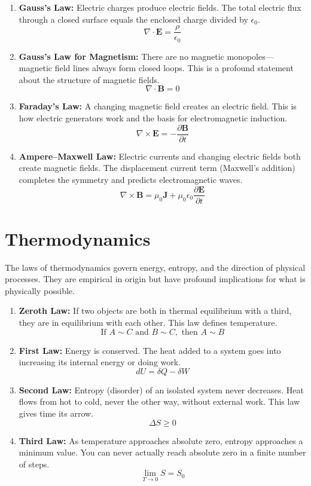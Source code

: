 \begin{enumerate}

\item \textbf{Gauss's Law:} Electric charges produce electric fields. The total electric flux through a closed surface equals the enclosed charge divided by $\epsilon_0$.
\[
\nabla \cdot \mathbf{E} = \frac{\rho}{\epsilon_0}
\]

\item \textbf{Gauss's Law for Magnetism:} There are no magnetic monopoles---magnetic field lines always form closed loops. This is a profound statement about the structure of magnetic fields.
\[
\nabla \cdot \mathbf{B} = 0
\]

\item \textbf{Faraday's Law:} A changing magnetic field creates an electric field. This is how electric generators work and the basis for electromagnetic induction.
\[
\nabla \times \mathbf{E} = -\frac{\partial \mathbf{B}}{\partial t}
\]

\item \textbf{Ampere--Maxwell Law:} Electric currents and changing electric fields both create magnetic fields. The displacement current term (Maxwell's addition) completes the symmetry and predicts electromagnetic waves.
\[
\nabla \times \mathbf{B} = \mu_0 \mathbf{J} + \mu_0 \epsilon_0 \frac{\partial \mathbf{E}}{\partial t}
\]

\end{enumerate}

\section*{Thermodynamics}

The laws of thermodynamics govern energy, entropy, and the direction of physical processes. They are empirical in origin but have profound implications for what is physically possible.

\begin{enumerate}

\item \textbf{Zeroth Law:} If two objects are both in thermal equilibrium with a third, they are in equilibrium with each other. This law defines temperature.
\[
\text{If } A \sim C \text{ and } B \sim C, \text{ then } A \sim B
\]

\item \textbf{First Law:} Energy is conserved. The heat added to a system goes into increasing its internal energy or doing work.
\[
dU = \delta Q - \delta W
\]

\item \textbf{Second Law:} Entropy (disorder) of an isolated system never decreases. Heat flows from hot to cold, never the other way, without external work. This law gives time its arrow.
\[
\Delta S \geq 0
\]

\item \textbf{Third Law:} As temperature approaches absolute zero, entropy approaches a minimum value. You can never actually reach absolute zero in a finite number of steps.
\[
\lim_{T \to 0} S = S_0
\]

\end{enumerate}

